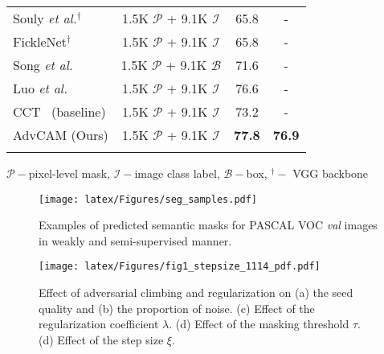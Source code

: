 \documentclass[final]{cvpr}
\begin{document}
\begin{table}[tbp]
\begin{threeparttable}
\begin{tabular}{l@{\hskip 0.1in}c@{\hskip 0.15in}cc}
Souly \textit{et al.}$^{\dagger}$~\cite{souly2017semi} & 1.5K $\mathcal{P}$ + 9.1K $\mathcal{I}$ &   65.8  & - \\
    FickleNet$^{\dagger}$~\cite{lee2019ficklenet} & 1.5K $\mathcal{P}$ + 9.1K $\mathcal{I}$ &   65.8  & - \\
    Song \textit{et al.}~\cite{song2019box}& 1.5K $\mathcal{P}$ + 9.1K $\mathcal{B}$ &   71.6 & -  \\

    
    Luo \textit{et al.}~\cite{luosemi}& 1.5K $\mathcal{P}$ + 9.1K $\mathcal{I}$ &   76.6 & -  \\
    CCT~\cite{ouali2020semi} (baseline)& 1.5K $\mathcal{P}$ + 9.1K $\mathcal{I}$  &   73.2 & -  \\
    AdvCAM (Ours) & 1.5K $\mathcal{P}$ + 9.1K $\mathcal{I}$ &   \textbf{77.8}  &  \textbf{76.9}\\


\Xhline{1pt}
    \end{tabular}\begin{tablenotes}
  \footnotesize
\item $\mathcal{P}-$pixel-level mask, $\mathcal{I}-$image class label, $\mathcal{B}-$box, $^{\dagger}-$ VGG backbone \\
\scriptsize
\end{tablenotes}
     \end{threeparttable}
  \label{tabsemi}
\vspace{-1.3em}

\end{table}%




\begin{figure*}[t]
\centering
\texttt{[image: latex/Figures/seg\_samples.pdf]}
\vspace{-.7em}
\caption{\label{segsample} Examples of predicted semantic masks for PASCAL VOC \textit{val} images in weakly and semi-supervised manner.}
\vspace{-1em}
\end{figure*}
 \begin{figure*}[t]
\centering
\texttt{[image: latex/Figures/fig1\_stepsize\_1114\_pdf.pdf]}
\vspace{-.7em}
\caption{\label{eachiter} 
Effect of adversarial climbing and regularization on (a) the seed quality and (b) the proportion of noise. (c) Effect of the regularization coefficient $\lambda$. (d) Effect of the masking threshold $\tau$. (d) Effect of the step size $\xi$.}
\vspace{-1em}
\end{figure*}
 
\end{document}
